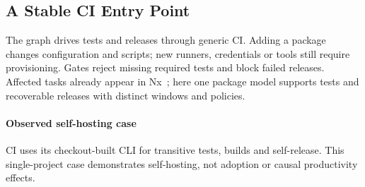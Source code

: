 \subsection{A Stable CI Entry Point}
The graph drives tests and releases through generic CI. Adding a package changes
configuration and scripts; new runners, credentials or tools still require
provisioning. Gates reject missing required tests and block failed releases.
Affected tasks already appear in Nx~\cite{nx}; here one package model supports
tests and recoverable releases with distinct windows and policies.

\paragraph{Observed self-hosting case}
CI uses its checkout-built CLI for transitive tests, builds and self-release.
This single-project case demonstrates self-hosting, not adoption or causal
productivity effects.
